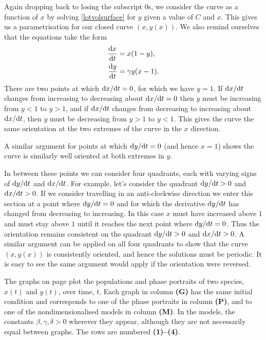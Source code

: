 \documentclass[a4paper, 12pt]{article}
\begin{document}
\begin{enumerate}[label={\bf \arabic{*}.\;}, ref={\arabic{*}},itemsep=3ex, left=0ex]
{\begin{enumerate}[label=(\alph*)]
          Again dropping back to losing the subscript 0s, we consider the curve as a function of $x$ by solving \cref{lotvolsurface} for $y$ given a value of $C$ and $x$. This gives us a parametrisation for our closed curve $(x,y(x))$. We also remind ourselves that the equations take the form%
          \begin{subequations}%
            \begin{align}%
              \fd{x}{t} &= x(1-y),\\
              \fd{y}{t}&=\gamma y (x-1).
            \end{align}
          \end{subequations}
          There are two points at  which $\fd{x}{t}=0$, for which we have $y=1$. If $\fd{x}{t}$ changes from increasing to decreasing about $\fd{x}{t}=0$ then $y$ must be increasing from $y<1$ to $y>1$, and if  $\fd{x}{t}$ changes from decreasing to increasing about $\fd{x}{t}$, then $y$ must be decreasing from $y>1$ to $y<1$. This gives the curve the same orientation at the two extremes of the curve in the $x$ direction.

          A similar argument for points at which $\fd{y}{t}=0$ (and hence $x=1$) shows the curve is similarly well oriented at both extremes in $y$.

          In between these points we can consider four quadrants, each with varying signs of $\fd{y}{t}$ and $\fd{x}{t}$. For example, let's consider the quadrant $\fd{y}{t}>0$ and $\fd{x}{t}>0$. If we consider travelling in an anti-clockwise direction we enter this section at a point where $\fd{y}{t}=0$ and for which the derivative $\fd{y}{t}$ has changed from decreasing to increasing. In this case $x$ must have increased above $1$ and must stay above $1$ until it reaches the next point where $\fd{y}{t}=0$. Thus the orientation remains consistent on the quadrant $\fd{y}{t}>0$ and $\fd{x}{t}>0$. A similar argument can be applied on all four quadrants to show that the curve $(x,y(x))$ is consistently oriented, and hence the solutions must be periodic. It is easy to see the same argument would apply if the orientation were reversed.

      \end{enumerate}
    }


    {
      \label{graphs-q}
      The graphs on page \pageref{graphs} plot the populations and phase portraits of two species, $x(t)$ and $y(t)$, over time, $t$. Each graph in column \textbf{(G)} has the same initial condition and corresponds to one of the phase portraits in column \textbf{(P)}, and to one of the nondimensionalised models in column \textbf{(M)}. In the models, the constants $\beta,\gamma,\delta>0$ wherever they appear, although they are not necessarily equal between graphs. The rows are numbered \textbf{(1)--(4)}.

}
\end{enumerate}
\end{document}
